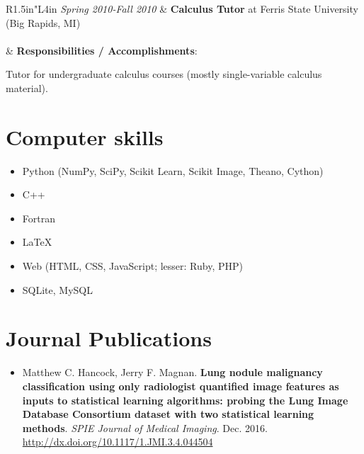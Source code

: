 \documentclass[a4paper,10pt]{report}
\begin{document}
\vspace{.15in}
\begin{tabular}{R{1.5in}"L{4in}}
    \emph{Spring 2010-Fall 2010} & \textbf{Calculus Tutor} at Ferris State University (Big Rapids, MI) \\
\\[4pt] & \textbf{Responsibilities / Accomplishments}:
        \begin{itemize}
        \setlength\itemsep{0pt}
        {\small
            \item Tutor for undergraduate calculus courses (mostly single-variable calculus material).
        }
        \end{itemize}
\end{tabular}

\vspace{.15in}


\section{Computer skills}

{ \begin{itemize} \item Python (NumPy, SciPy, Scikit Learn, Scikit Image, Theano, Cython) \end{itemize}}{ \begin{itemize} \item C++ \end{itemize}}{ \begin{itemize} \item Fortran \end{itemize}}{ \begin{itemize} \item \LaTeX \end{itemize}}{ \begin{itemize} \item Web (HTML, CSS, JavaScript; lesser: Ruby, PHP) \end{itemize}}{ \begin{itemize} \item SQLite, MySQL \end{itemize}}

\section{Journal Publications}

\begin{itemize}
    \item Matthew C. Hancock, Jerry F. Magnan. \textbf{Lung nodule malignancy classification using only radiologist quantified image features as inputs to statistical learning algorithms: probing the Lung Image Database Consortium dataset with two statistical learning methods}. \textit{SPIE Journal of Medical Imaging}. Dec. 2016. \url{http://dx.doi.org/10.1117/1.JMI.3.4.044504}\end{itemize}
\end{document}
